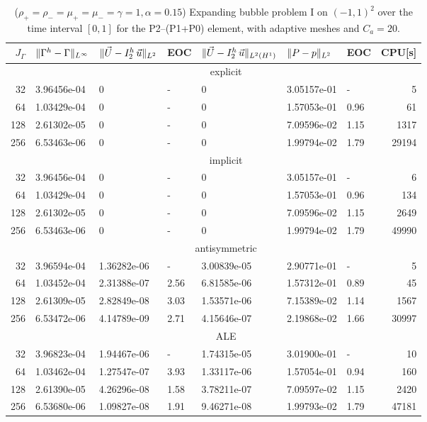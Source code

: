 \begin{table}
\center
\hspace*{-3.25cm}
\begin{tabular}{rllllllr}
\hline
$J_\Gamma$ & $\|\Gamma^h - \Gamma\|_{L^\infty}$ & $\|\vec U - I^h_{2}\,\vec u\|_{L^2}$ & EOC & $\|\vec U - I^h_{2}\,\vec u\|_{L^2(H^1)}$ & $\|P - p\|_{L^2}$ & EOC
& CPU[s] \\
\hline
& \multicolumn{7}{c}{explicit} \\
\hline
 32 & 3.96456e-04 & 0 & - & 0 & 3.05157e-01 &    - &     5 \\
 64 & 1.03429e-04 & 0 & - & 0 & 1.57053e-01 & 0.96 &    61 \\
128 & 2.61302e-05 & 0 & - & 0 & 7.09596e-02 & 1.15 &  1317 \\
256 & 6.53463e-06 & 0 & - & 0 & 1.99794e-02 & 1.79 & 29194 \\
\hline
& \multicolumn{7}{c}{implicit} \\
\hline
 32 & 3.96456e-04 & 0 & - & 0 & 3.05157e-01 &    - &     6 \\
 64 & 1.03429e-04 & 0 & - & 0 & 1.57053e-01 & 0.96 &   134 \\
128 & 2.61302e-05 & 0 & - & 0 & 7.09596e-02 & 1.15 &  2649 \\
256 & 6.53463e-06 & 0 & - & 0 & 1.99794e-02 & 1.79 & 49990 \\
\hline
& \multicolumn{7}{c}{antisymmetric} \\
\hline
 32 & 3.96594e-04 & 1.36282e-06 &    - & 3.00839e-05 & 2.90771e-01 &    - &
5 \\
 64 & 1.03452e-04 & 2.31388e-07 & 2.56 & 6.81585e-06 & 1.57312e-01 & 0.89 &
45 \\
128 & 2.61309e-05 & 2.82849e-08 & 3.03 & 1.53571e-06 & 7.15389e-02 & 1.14 &
1567 \\
256 & 6.53472e-06 & 4.14789e-09 & 2.71 & 4.15646e-07 & 2.19868e-02 & 1.66 &
30997 \\
\hline
& \multicolumn{7}{c}{ALE} \\
\hline
 32 & 3.96823e-04 & 1.94467e-06 &    - & 1.74315e-05 & 3.01900e-01 &    - &
10 \\
 64 & 1.03462e-04 & 1.27547e-07 & 3.93 & 1.33117e-06 & 1.57054e-01 & 0.94 &
160 \\
128 & 2.61390e-05 & 4.26296e-08 & 1.58 & 3.78211e-07 & 7.09597e-02 & 1.15 &
2420 \\
256 & 6.53680e-06 & 1.09827e-08 & 1.91 & 9.46271e-08 & 1.99793e-02 & 1.79 &
47181 \\
\hline
\end{tabular}
\hspace*{-3.25cm}
\caption[Navier--Stokes expanding bubble I errors P2--(P1+P0)]
{($\rho_+ = \rho_- = \mu_+ = \mu_- = \gamma = 1,\alpha=0.15$)
Expanding bubble problem I on $(-1,1)^2$ over the time interval $[0,1]$ for the
P2--(P1+P0) element, with adaptive meshes and $C_a=20$\textdegree.}
\label{tab:nsexpandingbubbleIp2p1p0}
\end{table}

